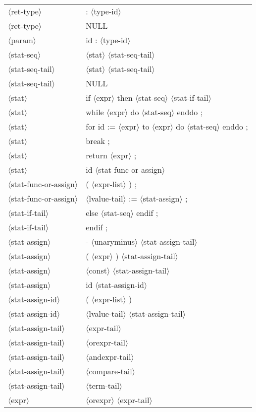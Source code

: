 \documentclass[11pt, fleqn]{article}
\newcommand{\atag}[1]{$\langle$#1$\rangle$}
\begin{document}
\begin{longtable}{l|l}
\atag{ret-type}					&	: \atag{type-id}		\\
\atag{ret-type}					&	NULL		\\
\atag{param}						&	id : \atag{type-id}		\\
\atag{stat-seq}					&	\atag{stat} \atag{stat-seq-tail}		\\
\atag{stat-seq-tail}				&	\atag{stat} \atag{stat-seq-tail}		\\
\atag{stat-seq-tail}				&	NULL		\\
\atag{stat}						&	if \atag{expr} then \atag{stat-seq} \atag{stat-if-tail}		\\
\atag{stat}						&	while \atag{expr} do \atag{stat-seq} enddo ;		\\
\atag{stat}						&	for id := \atag{expr} to \atag{expr} do \atag{stat-seq} enddo ;		\\
\atag{stat}						&	break ;		\\
\atag{stat}						&	return \atag{expr} ;		\\
\atag{stat}						&	id \atag{stat-func-or-assign}	\\
\atag{stat-func-or-assign}		&	( \atag{expr-list} ) ;	\\
\atag{stat-func-or-assign}		&	\atag{lvalue-tail} := \atag{stat-assign}	;	\\
\atag{stat-if-tail}				&	else \atag{stat-seq} endif ;		\\
\atag{stat-if-tail}				&	endif ;		\\
\atag{stat-assign}				&	- \atag{unaryminus} \atag{stat-assign-tail}	\\
\atag{stat-assign}				&	( \atag{expr} ) \atag{stat-assign-tail}	\\
\atag{stat-assign}				&	\atag{const}	 \atag{stat-assign-tail}		\\
\atag{stat-assign}				&	id \atag{stat-assign-id}	\\
\atag{stat-assign-id}			&	( \atag{expr-list} )		\\
\atag{stat-assign-id}			&	\atag{lvalue-tail} \atag{stat-assign-tail}	\\
\atag{stat-assign-tail}			&	\atag{expr-tail}		\\
\atag{stat-assign-tail}			&	\atag{orexpr-tail}		\\
\atag{stat-assign-tail}			&	\atag{andexpr-tail}		\\
\atag{stat-assign-tail}			&	\atag{compare-tail}		\\
\atag{stat-assign-tail}			&	\atag{term-tail}		\\
\atag{expr}						&	\atag{orexpr} \atag{expr-tail}		\\

\end{longtable}
\end{document}
